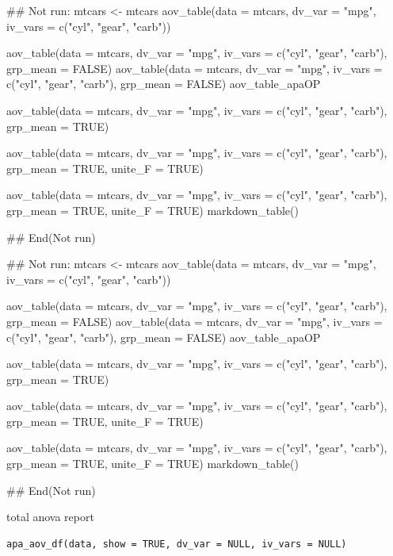 \documentclass[a4paper]{book}
\begin{document}
\begin{Examples}
\begin{ExampleCode}

\#\# Not run: 
mtcars <- mtcars%
aov_table(data = mtcars, dv_var = "mpg", iv_vars = c("cyl", "gear", "carb"))

aov_table(data = mtcars, dv_var = "mpg",
iv_vars = c("cyl", "gear", "carb"), grp_mean = FALSE)
aov_table(data = mtcars, dv_var = "mpg",
iv_vars = c("cyl", "gear", "carb"), grp_mean = FALSE) %
aov_table_apaOP

aov_table(data = mtcars, dv_var = "mpg",
 iv_vars = c("cyl", "gear", "carb"), grp_mean = TRUE)

aov_table(data = mtcars, dv_var = "mpg",
 iv_vars = c("cyl", "gear", "carb"), grp_mean = TRUE, unite_F = TRUE)

aov_table(data = mtcars, dv_var = "mpg",
 iv_vars = c("cyl", "gear", "carb"),
  grp_mean = TRUE, unite_F = TRUE) %
  markdown_table()

## End(Not run)




\#\# Not run: 
mtcars <- mtcars%
aov_table(data = mtcars, dv_var = "mpg", iv_vars = c("cyl", "gear", "carb"))

aov_table(data = mtcars, dv_var = "mpg",
iv_vars = c("cyl", "gear", "carb"), grp_mean = FALSE)
aov_table(data = mtcars, dv_var = "mpg",
iv_vars = c("cyl", "gear", "carb"), grp_mean = FALSE) %
aov_table_apaOP

aov_table(data = mtcars, dv_var = "mpg",
 iv_vars = c("cyl", "gear", "carb"), grp_mean = TRUE)

aov_table(data = mtcars, dv_var = "mpg",
 iv_vars = c("cyl", "gear", "carb"), grp_mean = TRUE, unite_F = TRUE)

aov_table(data = mtcars, dv_var = "mpg",
 iv_vars = c("cyl", "gear", "carb"),
  grp_mean = TRUE, unite_F = TRUE) %
  markdown_table()

## End(Not run)



\end{ExampleCode}
\end{Examples}
%
\begin{Description}
total anova report
\end{Description}
%
\begin{Usage}
\begin{verbatim}
apa_aov_df(data, show = TRUE, dv_var = NULL, iv_vars = NULL)
\end{verbatim}
\end{Usage}
\end{document}
